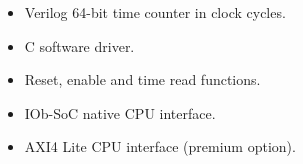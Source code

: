 \begin{itemize}
\item Verilog 64-bit time counter in clock cycles.
\item C software driver.
\item Reset, enable and time read functions.
\item IOb-SoC native CPU interface.
\item AXI4 Lite CPU interface (premium option).
\end{itemize}
